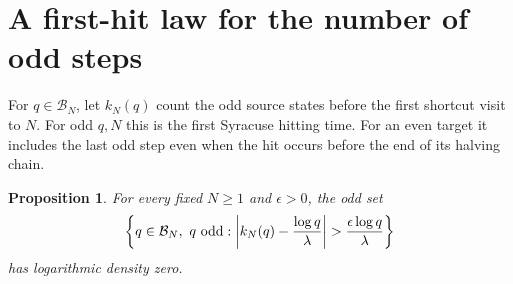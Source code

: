 \documentclass[11pt,a4paper]{article}
\newtheorem{proposition}[theorem]{Proposition}
\begin{document}
\section{A first-hit law for the number of odd steps}

For \(q\in\mathcal B_N\), let \(k_N(q)\) count the odd source
states before the first shortcut visit to \(N\). For odd \(q,N\)
this is the first Syracuse hitting time. For an even target it
includes the last odd step even when the hit occurs before the end
of its halving chain.

\begin{proposition}\label{prop:ct-time-law}
For every fixed \(N\ge1\) and \(\epsilon>0\), the odd set
\begin{equation}\label{eq:ct-time-exception}
 \left\{q\in\mathcal B_N,\ q\ {\rm odd}:
   \left|k_N(q)-\frac{\log q}{\lambda}\right|
                      >\frac{\epsilon\log q}{\lambda}\right\}
\end{equation}
has logarithmic density zero.
\end{proposition}
\end{document}
